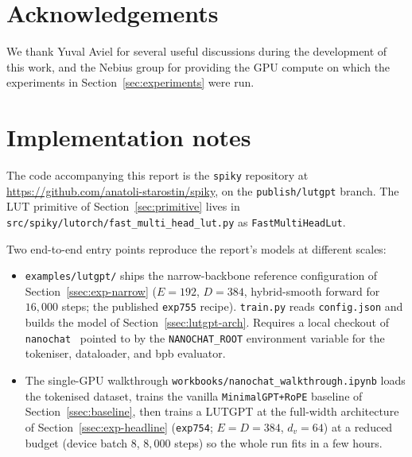 \documentclass[11pt]{article}
\begin{document}
\section*{Acknowledgements}

We thank Yuval Aviel for several useful discussions during the development of this work, and the Nebius group for providing the GPU compute on which the experiments in Section~\ref{sec:experiments} were run.

\appendix
\section{Implementation notes}
\label{sec:engineering}

The code accompanying this report is the \texttt{spiky} repository at \url{https://github.com/anatoli-starostin/spiky}, on the \texttt{publish/lutgpt} branch. The LUT primitive of Section~\ref{sec:primitive} lives in \texttt{src/spiky/lutorch/fast\_multi\_head\_lut.py} as \texttt{FastMultiHeadLut}.

Two end-to-end entry points reproduce the report's models at different scales:

\begin{itemize}[leftmargin=*,topsep=2pt,itemsep=2pt]
\item \texttt{examples/lutgpt/} ships the narrow-backbone reference configuration of Section~\ref{ssec:exp-narrow} ($E = 192$, $D = 384$, hybrid-smooth forward for $16{,}000$ steps; the published \texttt{exp755} recipe). \texttt{train.py} reads \texttt{config.json} and builds the model of Section~\ref{ssec:lutgpt-arch}. Requires a local checkout of \texttt{nanochat}~\citep{karpathy_nanochat} pointed to by the \texttt{NANOCHAT\_ROOT} environment variable for the tokeniser, dataloader, and bpb evaluator.
\item The single-GPU walkthrough \texttt{workbooks/nanochat\_walkthrough.ipynb} loads the tokenised dataset, trains the vanilla \texttt{MinimalGPT+RoPE} baseline of Section~\ref{ssec:baseline}, then trains a LUTGPT at the full-width architecture of Section~\ref{ssec:exp-headline} (\texttt{exp754}; $E = D = 384$, $d_v = 64$) at a reduced budget (device batch $8$, $8{,}000$ steps) so the whole run fits in a few hours.
\end{itemize}
\end{document}

